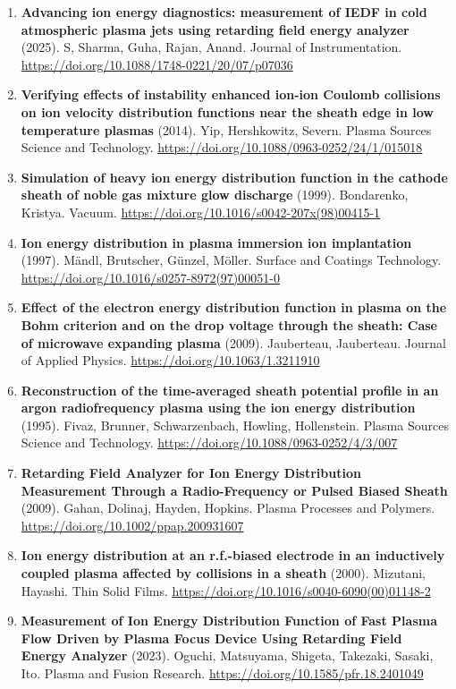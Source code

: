 \documentclass[11pt,a4paper]{article}
\begin{document}
\begin{enumerate}[leftmargin=1.4em]
\item \textbf{Advancing ion energy diagnostics: measurement of IEDF in cold atmospheric plasma jets using retarding field energy analyzer} (2025). S, Sharma, Guha, Rajan, Anand. Journal of Instrumentation. \url{https://doi.org/10.1088/1748-0221/20/07/p07036}
\item \textbf{Verifying effects of instability enhanced ion-ion Coulomb collisions on ion velocity distribution functions near the sheath edge in low temperature plasmas} (2014). Yip, Hershkowitz, Severn. Plasma Sources Science and Technology. \url{https://doi.org/10.1088/0963-0252/24/1/015018}
\item \textbf{Simulation of heavy ion energy distribution function in the cathode sheath of noble gas mixture glow discharge} (1999). Bondarenko, Kristya. Vacuum. \url{https://doi.org/10.1016/s0042-207x(98)00415-1}
\item \textbf{Ion energy distribution in plasma immersion ion implantation} (1997). Mändl, Brutscher, Günzel, Möller. Surface and Coatings Technology. \url{https://doi.org/10.1016/s0257-8972(97)00051-0}
\item \textbf{Effect of the electron energy distribution function in plasma on the Bohm criterion and on the drop voltage through the sheath: Case of microwave expanding plasma} (2009). Jauberteau, Jauberteau. Journal of Applied Physics. \url{https://doi.org/10.1063/1.3211910}
\item \textbf{Reconstruction of the time-averaged sheath potential profile in an argon radiofrequency plasma using the ion energy distribution} (1995). Fivaz, Brunner, Schwarzenbach, Howling, Hollenstein. Plasma Sources Science and Technology. \url{https://doi.org/10.1088/0963-0252/4/3/007}
\item \textbf{Retarding Field Analyzer for Ion Energy Distribution Measurement Through a Radio-Frequency or Pulsed Biased Sheath} (2009). Gahan, Dolinaj, Hayden, Hopkins. Plasma Processes and Polymers. \url{https://doi.org/10.1002/ppap.200931607}
\item \textbf{Ion energy distribution at an r.f.-biased electrode in an inductively coupled plasma affected by collisions in a sheath} (2000). Mizutani, Hayashi. Thin Solid Films. \url{https://doi.org/10.1016/s0040-6090(00)01148-2}
\item \textbf{Measurement of Ion Energy Distribution Function of Fast Plasma Flow Driven by Plasma Focus Device Using Retarding Field Energy Analyzer} (2023). Oguchi, Matsuyama, Shigeta, Takezaki, Sasaki, Ito. Plasma and Fusion Research. \url{https://doi.org/10.1585/pfr.18.2401049}
\end{enumerate}
\end{document}
